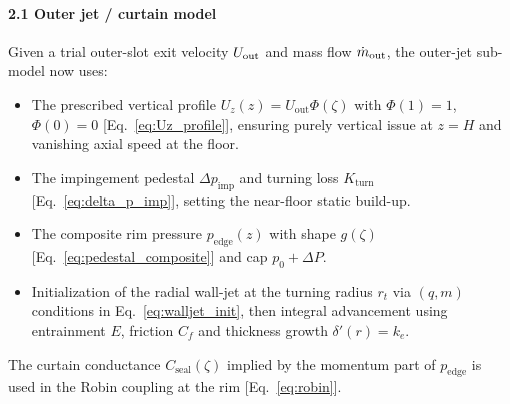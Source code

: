\documentclass[11pt,a4paper]{article}
\begin{document}
\paragraph{2.1 Outer jet / curtain model}  
Given a trial outer-slot exit velocity \(U_{\rm out}\) and mass flow \(\dot m_{\rm out}\), the outer-jet sub-model now uses:
\begin{itemize}
  \item The prescribed vertical profile \(U_z(z)=U_{\mathrm{out}}\Phi(\zeta)\) with \(\Phi(1)=1\), \(\Phi(0)=0\) [Eq.~\eqref{eq:Uz_profile}], ensuring purely vertical issue at \(z=H\) and vanishing axial speed at the floor.
  \item The impingement pedestal \(\Delta p_{\mathrm{imp}}\) and turning loss \(K_{\mathrm{turn}}\) [Eq.~\eqref{eq:delta_p_imp}], setting the near-floor static build-up.
  \item The composite rim pressure \(p_{\mathrm{edge}}(z)\) with shape \(g(\zeta)\) [Eq.~\eqref{eq:pedestal_composite}] and cap \(p_0+\Delta P\).
  \item Initialization of the radial wall-jet at the turning radius \(r_t\) via \((q,m)\) conditions in Eq.~\eqref{eq:walljet_init}, then integral advancement using entrainment \(E\), friction \(C_f\) and thickness growth \(\delta'(r)=k_e\).
\end{itemize}
The curtain conductance \(C_{\mathrm{seal}}(\zeta)\) implied by the momentum part of \(p_{\mathrm{edge}}\) is used in the Robin coupling at the rim [Eq.~\eqref{eq:robin}].
\end{document}
